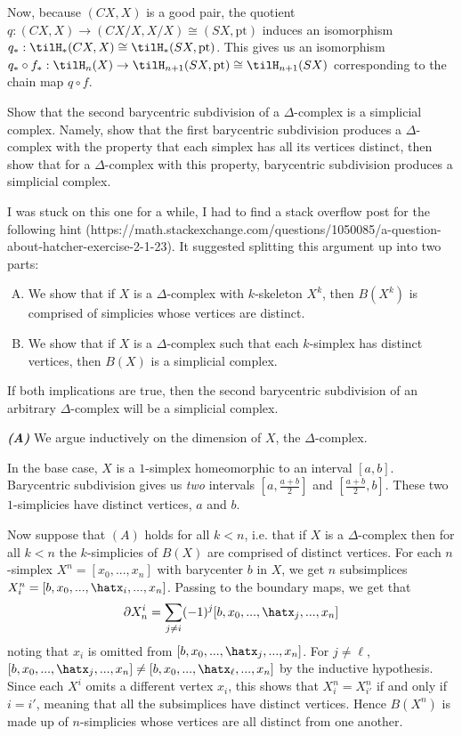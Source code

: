 \begin{homework}[e]
\begin{prf}
    Now, because $(CX,X)$ is a good pair, the quotient $q:(CX,X) \to (CX/X,X/X) \cong (SX,\text{pt})$ induces an isomorphism $q_*:\tilH_*(CX,X) \cong\tilH_*(SX,\text{pt})$. This gives us an isomorphism $q_*\circ f_*:\tilH_n(X) \to \tilH_{n+1}(SX,\text{pt}) \cong \tilH_{n+1}(SX)$ corresponding to the chain map $q\circ f$.
  \end{prf}
   Show that the second barycentric subdivision of a $\Delta$-complex is a simplicial complex. Namely, show that the first barycentric subdivision produces a $\Delta$-complex with the property that each simplex has all its vertices distinct, then show that for a $\Delta$-complex with this property, barycentric subdivision produces a simplicial complex.
  \begin{prf}
    I was stuck on this one for a while, I had to find a stack overflow post for the following hint (https://math.stackexchange.com/questions/1050085/a-question-about-hatcher-exercise-2-1-23). It suggested splitting this argument up into two parts: 
    \begin{enumerate}[(A)]
      \item We show that if $X$ is a $\Delta$-complex with $k$-skeleton $X^k$, then $B(X^k)$ is comprised of simplicies whose vertices are distinct.
      \item We show that if $X$ is a $\Delta$-complex such that each $k$-simplex has distinct vertices, then $B(X)$ is a simplicial complex.
    \end{enumerate}
    If both implications are true, then the second barycentric subdivision of an arbitrary $\Delta$-complex will be a simplicial complex.

    \bigskip

    \noindent \textbf{\emph{(A)}}\hspace{1em} We argue inductively on the dimension of $X$, the $\Delta$-complex.

    In the base case, $X$ is a $1$-simplex homeomorphic to an interval $[a,b]$. Barycentric subdivision gives us \emph{two} intervals $\left[a,\frac{a+b}{2}\right]$ and $\left[\frac{a+b}{2},b\right]$. These two $1$-simplicies have distinct vertices, $a$ and $b$.

    Now suppose that $(A)$ holds for all $k < n$, i.e. that if $X$ is a $\Delta$-complex then for all $k < n$ the $k$-simplicies of $B(X)$ are comprised of distinct vertices. For each $n$-simplex $X^n = [x_0,...,x_n]$ with barycenter $b$ in $X$, we get $n$ subsimplices $X_i^n = [b,x_0,...,\hatx_i,...,x_n]$. Passing to the boundary maps, we get that
    \begin{align*}
      \partial X^i_n = \sum_{j \neq i} (-1)^j[b,x_0,...,\hatx_j,...,x_n]
    \end{align*}
    noting that $x_i$ is omitted from $[b,x_0,...,\hatx_j,...,x_n]$. For $j\neq \ell$, $[b,x_0,...,\hatx_j,...,x_n]\neq [b,x_0,...,\hatx_\ell,...,x_n]$ by the inductive hypothesis. Since each $X^i$ omits a different vertex $x_i$, this shows that $X^n_i = X^n_{i'}$ if and only if $i = i'$, meaning that all the subsimplices have distinct vertices. Hence $B(X^n)$ is made up of $n$-simplicies whose vertices are all distinct from one another.


\end{prf}
\end{homework}

